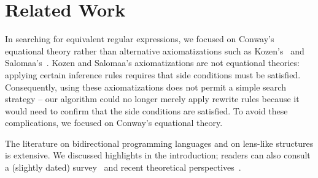 \documentclass[sigplan,acmsmall]{acmart}
\begin{document}



\section{Related Work}
\label{sec:related}

\ifdraft\else {}
\fi

In searching for equivalent regular expressions, we focused on
Conway's equational theory rather than
alternative axiomatizations such as Kozen's~\cite{kozen-complete}
and Salomaa's~\cite{salomaa-complete}.  Kozen and Salomaa's
axiomatizations are not equational theories: applying certain
inference rules requires that side conditions must be satisfied.  
Consequently, using these
axiomatizations does not permit a simple search strategy -- our
algorithm could no longer merely apply rewrite rules because it would
need to confirm that the side conditions
are satisfied. To avoid these complications, we focused on 
Conway's equational theory.

The literature on bidirectional programming languages
and on lens-like structures is extensive.  We discussed
highlights in the introduction; readers can also
consult a (slightly dated)
survey~\cite{DBLP:conf/icmt/CzarneckiFHLST09} and
recent theoretical perspectives~\cite{DBLP:journals/chinaf/FischerHP15,
DBLP:conf/birthday/Abou-SalehCGMS16}.
\end{document}

